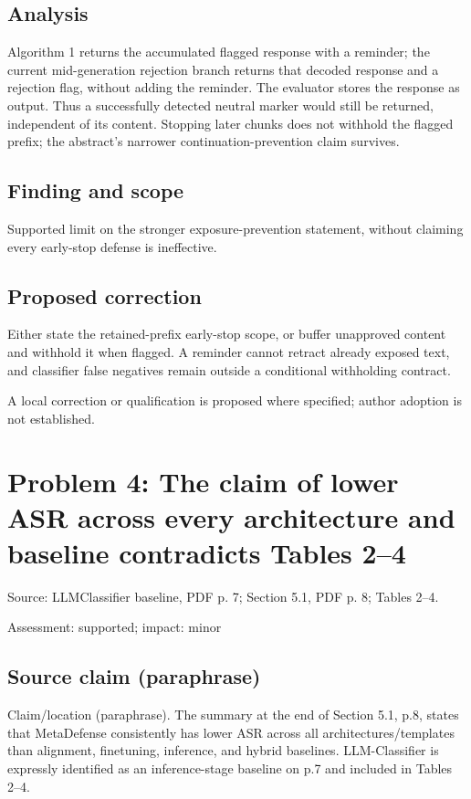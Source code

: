 \documentclass[11pt]{article}
\begin{document}
\subsection*{Analysis}

Algorithm 1 returns the accumulated flagged response with a reminder; the current mid-generation rejection branch returns that decoded response and a rejection flag, without adding the reminder. The evaluator stores the response as output. Thus a successfully detected neutral marker would still be returned, independent of its content. Stopping later chunks does not withhold the flagged prefix; the abstract's narrower continuation-prevention claim survives.

\subsection*{Finding and scope}

Supported limit on the stronger exposure-prevention statement, without claiming every early-stop defense is ineffective.

\subsection*{Proposed correction}

Either state the retained-prefix early-stop scope, or buffer unapproved content and withhold it when flagged. A reminder cannot retract already exposed text, and classifier false negatives remain outside a conditional withholding contract.

A local correction or qualification is proposed where specified; author adoption is not established.

\section*{Problem 4: The claim of lower ASR across every architecture and baseline contradicts Tables 2–4}

Source: LLMClassifier baseline, PDF p. 7; Section 5.1, PDF p. 8; Tables 2–4.

Assessment: supported; impact: minor

\subsection*{Source claim (paraphrase)}

Claim/location (paraphrase). The summary at the end of Section 5.1, p.8, states that MetaDefense consistently has lower ASR across all architectures/templates than alignment, finetuning, inference, and hybrid baselines. LLM-Classifier is expressly identified as an inference-stage baseline on p.7 and included in Tables 2–4.
\end{document}
